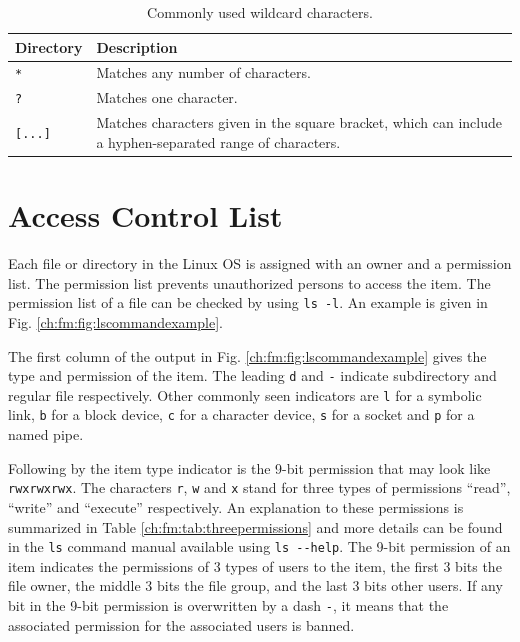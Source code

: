 \begin{table}
  \centering \caption{Commonly used wildcard characters.}\label{ch:fm:tab:metacharacters}
  \begin{tabularx}{\textwidth}{lX}
    \hline
    Directory & Description \\ \hline
    \verb|*| & Matches any number of characters. \\ \hdashline
    \verb|?| & Matches one character. \\ \hdashline
    \verb|[...]| & Matches characters given in the square bracket, which can include a hyphen-separated range of characters. \\
    \hline
  \end{tabularx}
\end{table}

\section{Access Control List}

Each file or directory in the Linux OS is assigned with an owner and a permission list. The permission list prevents unauthorized persons to access the item. The permission list of a file can be checked by using \verb|ls -l|. An example is given in Fig. \ref{ch:fm:fig:lscommandexample}.

The first column of the output in Fig. \ref{ch:fm:fig:lscommandexample} gives the type and permission of the item. The leading \verb|d| and \verb|-| indicate subdirectory and regular file respectively. Other commonly seen indicators are \verb|l| for a symbolic link, \verb|b| for a block device, \verb|c| for a character device, \verb|s| for a socket and \verb|p| for a named pipe.

Following by the item type indicator is the 9-bit permission that may look like \verb|rwxrwxrwx|. The characters \verb|r|, \verb|w| and \verb|x| stand for three types of permissions ``read'', ``write'' and ``execute'' respectively. An explanation to these permissions is summarized in Table \ref{ch:fm:tab:threepermissions} and more details can be found in the \verb|ls| command manual available using \verb|ls --help|. The 9-bit permission of an item indicates the permissions of 3 types of users to the item, the first 3 bits the file owner, the middle 3 bits the file group, and the last 3 bits other users. If any bit in the 9-bit permission is overwritten by a dash \verb|-|, it means that the associated permission for the associated users is banned.

